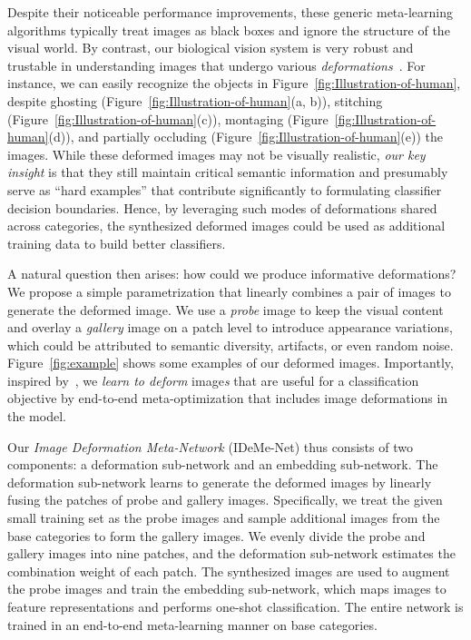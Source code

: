 \documentclass[10pt,letterpaper,twocolumn]{article}
\begin{document}
Despite their noticeable performance improvements, these generic meta-learning
algorithms typically treat images as black boxes and ignore the structure
of the visual world. By contrast, our biological vision system is
very robust and trustable in understanding images that undergo various \emph{deformations}~\cite{vermaak2005sensor}. For instance,
we can easily recognize the objects in Figure~\ref{fig:Illustration-of-human},
despite ghosting (Figure~\ref{fig:Illustration-of-human}(a, b)), stitching
(Figure~\ref{fig:Illustration-of-human}(c)), montaging (Figure~\ref{fig:Illustration-of-human}(d)),
and partially occluding (Figure~\ref{fig:Illustration-of-human}(e)) the images.
While these deformed images may not be visually realistic, \emph{our
key insight} is that they still maintain critical semantic information
and presumably serve as ``hard examples'' that contribute significantly
to formulating classifier decision boundaries. Hence, by leveraging
such modes of deformations shared across categories, the synthesized
deformed images could be used as additional training data to build
better classifiers.


A natural question then arises: how could we produce informative deformations?
We propose a simple parametrization
that linearly combines a pair of images to generate the deformed image.
We use a {\em probe} image to keep the visual content and overlay a {\em gallery}
image on a patch level to introduce appearance variations, which could
be attributed to semantic diversity, artifacts, or even random noise. Figure~\ref{fig:example} shows some examples of our deformed images. 
Importantly, inspired by~\cite{imaginaryData}, we \emph{learn to
deform }image\emph{s} that are useful for a classification objective by end-to-end
meta-optimization that includes image
deformations in the model.



Our \emph{Image Deformation Meta-Network} (IDeMe-Net) thus consists
of two components: a deformation sub-network and an embedding sub-network.
The deformation sub-network learns to generate the deformed images
by linearly fusing the patches of probe and gallery images. Specifically,
we treat the given small training set as the probe images and sample
additional images from the base categories to form the gallery images.
We evenly divide the probe and gallery images into nine patches, and
the deformation sub-network estimates the combination weight of each
patch. The synthesized images are used to augment the probe
images and train the embedding sub-network, which maps images to feature
representations and performs one-shot classification. The entire network
is trained in an end-to-end meta-learning manner on base categories.
\end{document}
